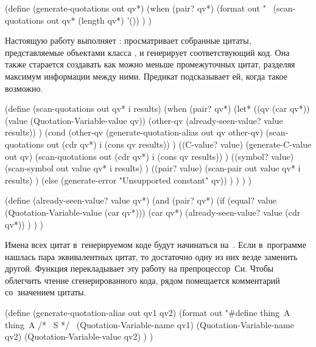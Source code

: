 \begin{code:lisp}
(define (generate-quotations out qv*)
  (when (pair? qv*)
    (format out "~%
    (scan-quotations out qv* (length qv*) '()) ) )
\end{code:lisp}

Настоящую работу выполняет : просматривает собранные
цитаты, представляемые объектами класса , и генерирует
соответствующий код. Она также старается создавать как можно меньше
промежуточных цитат, разделяя максимум информации между ними. Предикат
 подсказывает ей, когда такое возможно.

\begin{code:lisp}
(define (scan-quotations out qv* i results)
  (when (pair? qv*)
    (let* ((qv       (car qv*))
           (value    (Quotation-Variable-value qv))
           (other-qv (already-seen-value? value results)) )
      (cond
        (other-qv
          (generate-quotation-alias out qv other-qv)
          (scan-quotations out (cdr qv*) i (cons qv results)) )
        ((C-value? value)
          (generate-C-value out qv)
          (scan-quotations out (cdr qv*) i (cons qv results)) )
        ((symbol? value) (scan-symbol out value qv* i results) )
        ((pair? value)   (scan-pair out value qv* i results) )
        (else (generate-error "Unsupported constant" qv)) ) ) ) )

(define (already-seen-value? value qv*)
  (and (pair? qv*)
       (if (equal? value (Quotation-Variable-value (car qv*)))
           (car qv*)
           (already-seen-value? value (cdr qv*)) ) ) )
\end{code:lisp}

Имена всех цитат в~генерируемом коде будут начинаться на~. Если
в~программе нашлась пара эквивалентных цитат, то достаточно одну из них везде
заменить другой. Функция  перекладывает эту работу
на препроцессор~Си. Чтобы облегчить чтение сгенерированного кода, рядом
помещается комментарий со~значением цитаты.

\begin{code:lisp}
(define (generate-quotation-alias out qv1 qv2)
  (format out "#define thing~A thing~A /* ~S */~%
          (Quotation-Variable-name qv1)
          (Quotation-Variable-name qv2)
          (Quotation-Variable-value qv2) ) )
\end{code:lisp}

